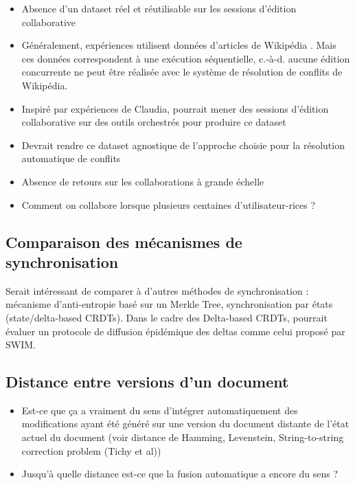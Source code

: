 \documentclass[12pt]{thesul}
\theoremstyle{definition}
\newcommand{\ie}{c.-à-d.\xspace}
\begin{document}
\begin{itemize}
  \item Absence d'un dataset réel et réutilisable sur les sessions d'édition collaborative
  \item Généralement, expériences utilisent données d'articles de Wikipédia .
    Mais ces données correspondent à une exécution séquentielle, \ie aucune édition concurrente ne peut être réalisée avec le système de résolution de conflits de Wikipédia.
  \item Inspiré par expériences de Claudia, pourrait mener des sessions d'édition collaborative sur des outils orchestrés pour produire ce dataset
  \item Devrait rendre ce dataset agnostique de l'approche choisie pour la résolution automatique de conflits
  \item Absence de retours sur les collaborations à grande échelle
  \item Comment on collabore lorsque plusieurs centaines d'utilisateur-rices ?
\end{itemize}

\subsection{Comparaison des mécanismes de synchronisation}

Serait intéressant de comparer à d'autres méthodes de synchronisation : mécanisme d'anti-entropie basé sur un Merkle Tree\cite{2007-dynamo, 2015-approximate-hash-based-set-reconciliation, 2017-anti-entropy-without-merkle-trees}, synchronisation par états (state/delta-based \acp{CRDT}).
Dans le cadre des Delta-based \acp{CRDT}, pourrait évaluer un protocole de diffusion épidémique des deltas comme celui proposé par SWIM\cite{swim2002}.

\subsection{Distance entre versions d'un document}

\begin{itemize}
  \item Est-ce que ça a vraiment du sens d'intégrer automatiquement des modifications ayant été généré sur une version du document distante de l'état actuel du document (voir distance de Hamming, Levenstein, String-to-string correction problem (Tichy et al))
  \item Jusqu'à quelle distance est-ce que la fusion automatique a encore du sens ?
\end{itemize}
\end{document}
